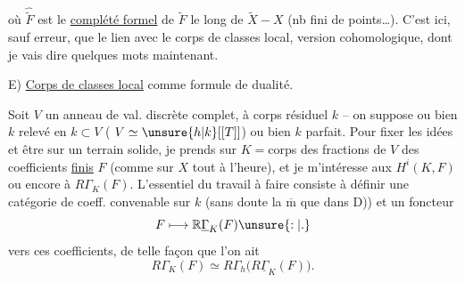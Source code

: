 où $\widehat{\widetilde F}$ est le \uline{complété formel} de $\widetilde F$ le long de $\widetilde X-X$ (nb fini de points\ldots). C'est ici, sauf erreur, que  le lien avec le corps de classes local, version cohomologique, dont je vais dire quelques mots maintenant.

E) \uline{Corps de classes local} comme formule de dualité.

Soit $V$ un anneau de val. discrète complet, à corps résiduel $k$ -- on suppose ou bien $k$ relevé en $k\subset V$ ( $V\simeq\unsure{h|k}[[T]]$) ou bien $k$ parfait. Pour fixer les idées et être sur un terrain solide, je prends  sur $K={}$corps des fractions de $V$ des coefficients \uline{finis} $F$ (comme sur $X$ tout à l'heure), et je m'intéresse aux $H^i(K,F)$ ou encore à $R\Gamma_K(F)$. L'essentiel du travail à faire consiste à définir une catégorie de coeff. convenable sur $k$ (sans doute la $\overline{\mathrm m}$ que dans D)) et un foncteur
\[
 F\longmapsto\mathbb{R}\underline{\Gamma}_K(F)\unsure{:|.}
\]
vers ces coefficients, de telle façon que l'on ait
\[
 R\Gamma_K(F)\simeq R\Gamma_h\bigl(R\underline{\Gamma}_K(F)\bigr).
\]

